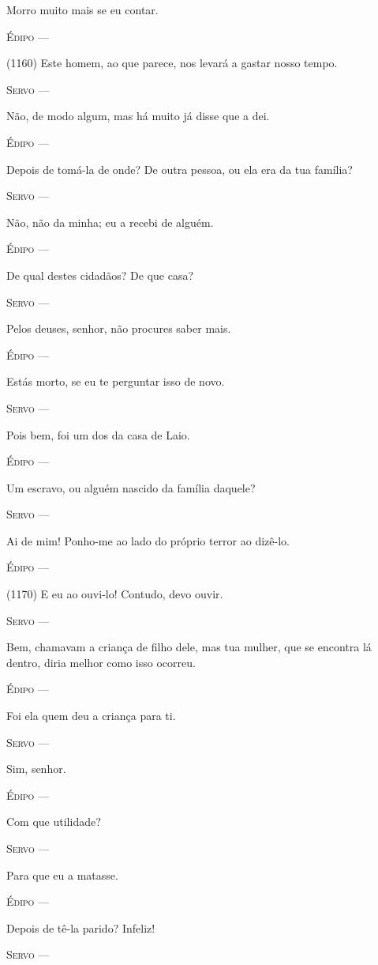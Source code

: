 Morro muito mais se eu contar.

\textsc{Édipo} ---

(1160) Este homem, ao que parece, nos levará a gastar nosso tempo.

\textsc{Servo} ---

Não, de modo algum, mas há muito já disse que a dei.

\textsc{Édipo} ---

Depois de tomá-la de onde? De outra pessoa, ou ela era da tua família?

\textsc{Servo} ---

Não, não da minha; eu a recebi de alguém.

\textsc{Édipo} ---

De qual destes cidadãos? De que casa?

\textsc{Servo} ---

Pelos deuses, senhor, não procures saber mais.

\textsc{Édipo} ---

Estás morto, se eu te perguntar isso de novo.

\textsc{Servo} ---

Pois bem, foi um dos da casa de Laio.

\textsc{Édipo} ---

Um escravo, ou alguém nascido da família daquele?

\textsc{Servo} ---

Ai de mim! Ponho-me ao lado do próprio terror ao dizê-lo.

\textsc{Édipo} ---

(1170) E eu ao ouvi-lo! Contudo, devo ouvir.

\textsc{Servo} ---

Bem, chamavam a criança de filho dele, mas tua mulher, que se encontra
lá dentro, diria melhor como isso ocorreu.

\textsc{Édipo} ---

Foi ela quem deu a criança para ti.

\textsc{Servo} ---

Sim, senhor.

\textsc{Édipo} ---

Com que utilidade?

\textsc{Servo} ---

Para que eu a matasse.

\textsc{Édipo} ---

Depois de tê-la parido? Infeliz!

\textsc{Servo} ---

